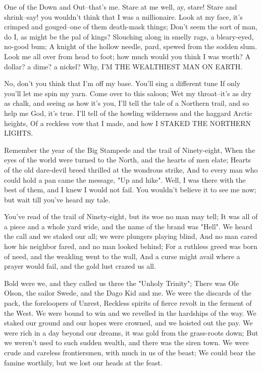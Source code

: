 
\begin{poemblock}
 One of the Down and Out--that's me.  Stare at me well, ay, stare!
 Stare and shrink--say! you wouldn't think that I was a millionaire.
 Look at my face, it's crimped and gouged--one of them death-mask things;
 Don't seem the sort of man, do I, as might be the pal of kings?
 Slouching along in smelly rags, a bleary-eyed, no-good bum;
 A knight of the hollow needle, pard, spewed from the sodden slum.
 Look me all over from head to foot; how much would you think I was worth?
 A dollar? a dime? a nickel?  Why, I'M THE WEALTHIEST MAN ON EARTH.

 No, don't you think that I'm off my base.  You'll sing a different tune
 If only you'll let me spin my yarn.  Come over to this saloon;
 Wet my throat--it's as dry as chalk, and seeing as how it's you,
 I'll tell the tale of a Northern trail, and so help me God, it's true.
 I'll tell of the howling wilderness and the haggard Arctic heights,
 Of a reckless vow that I made, and how I STAKED THE NORTHERN LIGHTS.

 Remember the year of the Big Stampede and the trail of Ninety-eight,
 When the eyes of the world were turned to the North,
   and the hearts of men elate;
 Hearts of the old dare-devil breed thrilled at the wondrous strike,
 And to every man who could hold a pan came the message, "Up and hike".
 Well, I was there with the best of them, and I knew I would not fail.
 You wouldn't believe it to see me now; but wait till you've heard my tale.

 You've read of the trail of Ninety-eight, but its woe no man may tell;
 It was all of a piece and a whole yard wide,
   and the name of the brand was "Hell".
 We heard the call and we staked our all; we were plungers playing blind,
 And no man cared how his neighbor fared, and no man looked behind;
 For a ruthless greed was born of need, and the weakling went to the wall,
 And a curse might avail where a prayer would fail,
   and the gold lust crazed us all.

 Bold were we, and they called us three the "Unholy Trinity";
 There was Ole Olson, the sailor Swede, and the Dago Kid and me.
 We were the discards of the pack, the foreloopers of Unrest,
 Reckless spirits of fierce revolt in the ferment of the West.
 We were bound to win and we revelled in the hardships of the way.
 We staked our ground and our hopes were crowned,
   and we hoisted out the pay.
 We were rich in a day beyond our dreams,
   it was gold from the grass-roots down;
 But we weren't used to such sudden wealth, and there was the siren town.
 We were crude and careless frontiersmen, with much in us of the beast;
 We could bear the famine worthily, but we lost our heads at the feast.


\end{poemblock}
